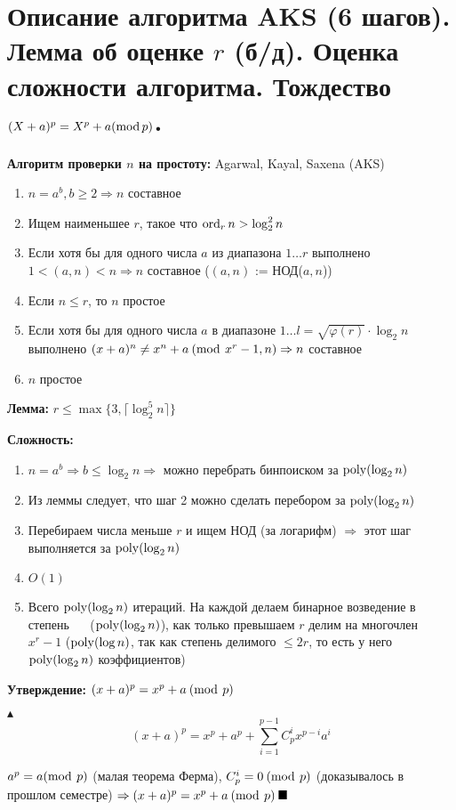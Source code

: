 \setcounter{section}{41}
\section{Описание алгоритма AKS (6 шагов). Лемма об оценке $r$ (б/д). Оценка сложности алгоритма. Тождество $(X + a)^p = X^p + a (\operatorname{mod} p)$.}
\par \textbf{Алгоритм проверки $n$ на простоту:} Agarwal, Kayal, Saxena (AKS) \begin{enumerate}
    \item $n=a^b, b \geq 2 \Rightarrow n$ составное
    \item Ищем наименьшее $r$, такое что $\operatorname{ord}_r n > \log_2^2 n$
    \item Если хотя бы для одного числа $a$ из диапазона $1\ldots r$ выполнено $1 < (a, n) < n \Rightarrow n$ составное ($(a,n)$ := НОД($a, n$))
    \item Если $n \leq r$, то $n$ простое
    \item Если хотя бы для одного числа $a$ в диапазоне $1\ldots l=\sqrt{\varphi(r)} \cdot \log_2 n$ выполнено $(x+a)^n \neq x^n+a \: (\operatorname{mod} \: x^r-1, n) \Rightarrow n$ составное
    \item $n$ простое
\end{enumerate}
\par \textbf{Лемма:} $r \leq \max\{3, \lceil \log_2^5 n \rceil\}$
\par \textbf{Сложность:} \begin{enumerate}
    \item $n=a^b \Rightarrow b \leq \log_2 n \Rightarrow$ можно перебрать бинпоиском за $\operatorname{poly}(\log_2 n)$
    \item Из леммы следует, что шаг 2 можно сделать перебором за $\operatorname{poly}(\log_2 n)$
    \item Перебираем числа меньше $r$ и ищем НОД (за логарифм) $\Rightarrow$ этот шаг выполняется за $\operatorname{poly}(\log_2 n)$
    \item $O(1)$
    \item Всего $\operatorname{poly}(\log_2 n)$ итераций. На каждой делаем бинарное возведение в степень $\quad$ ($\operatorname{poly}(\log_2 n)$), как только превышаем $r$ делим на многочлен $x^r-1$ ($\operatorname{poly}(\log n)$, так как степень делимого $\leq 2r$, то есть у него $\operatorname{poly}(\log_2 n)$ коэффициентов)
\end{enumerate}
\par \textbf{Утверждение:} $(x+a)^p = x^p+a \: (\operatorname{mod} \: p)$
\par $\blacktriangle$ $$(x+a)^p=x^p+a^p+\sum_{i=1}^{p-1} C_p^i x^{p-i}a^i$$
\par $a^p=a (\operatorname{mod} \: p)$ (малая теорема Ферма), $C_p^i=0 \: (\operatorname{mod} \: p)$ (доказывалось в прошлом семестре) $\Rightarrow (x+a)^p=x^p + a \: (\operatorname{mod} \: p) \: \blacksquare$